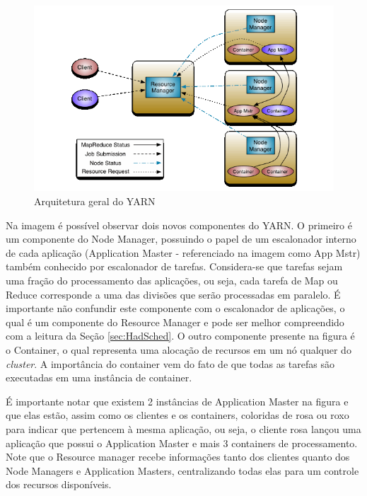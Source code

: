 \begin{figure}[!hbtn]
   \centering
   \includegraphics[width=12cm]{figuras/Figura06-YarnArch.png}
   \caption{Arquitetura geral do YARN \cite{YARN}}
   \label{fig:ArqYARN}
\end{figure}

Na imagem é possível observar dois novos componentes do YARN. O primeiro é um componente do Node Manager, possuindo o papel de um escalonador interno de cada aplicação (Application Master - referenciado na imagem como App Mstr) também conhecido por escalonador de tarefas. Considera-se que tarefas sejam uma fração do processamento das aplicações, ou seja, cada tarefa de Map ou Reduce corresponde a uma das divisões que serão processadas em paralelo. É importante não confundir este componente com o escalonador de aplicações, o qual é um componente do Resource Manager e pode ser melhor compreendido com a leitura da Seção \ref{sec:HadSched}. O outro componente presente na figura é o Container, o qual representa uma alocação de recursos em um nó qualquer do \textit{cluster}. A importância do container vem do fato de que todas as tarefas são executadas em uma instância de container.

É importante notar que existem 2 instâncias de Application Master na figura e que elas estão, assim como os clientes e os containers, coloridas de rosa ou roxo para indicar que pertencem à mesma aplicação, ou seja, o cliente rosa lançou uma aplicação que possui o Application Master e mais 3 containers de processamento. Note que o Resource manager recebe informações tanto dos clientes quanto dos Node Managers e Application Masters, centralizando todas elas para um controle dos recursos disponíveis.

